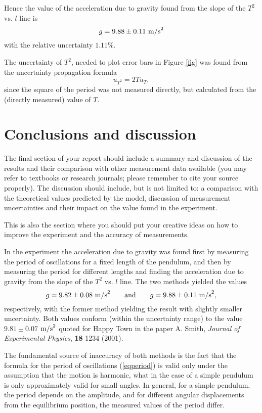 \documentclass{article}
\begin{document}
Hence the value of the acceleration due to gravity found from the slope of the $T^2$ vs. $l$ line is
$$
g = 9.88 \pm 0.11\ {\rm{m/s}}^2
$$
with the relative uncertainty $1.11\%$.

The uncertainty of $T^2$, needed to plot error bars in Figure \ref{fig} was found from the uncertainty propagation formula
$$
u_{T^2} = 2 T u_T,
$$
since the square of the period was not measured directly, but calculated from the (directly measured) value of $T$.

\section{Conclusions and discussion}

{\color{blue}The final section of your report should include a summary and discussion of the results and their comparison with other measurement data available (you may refer to textbooks or research journals; please remember to cite your source properly).  The discussion should include, but is not limited to: a comparison with the theoretical values predicted by the model, discussion of measurement uncertainties and their impact on the value found in the experiment.  

This is also the section where you should put your creative ideas on how to improve the experiment and the accuracy of measurements.}
\vspace*{1.5em}



In the experiment the acceleration due to gravity was found first by measuring the period of oscillations for a fixed length of the pendulum, and then by measuring the period for different lengths and finding the acceleration due to gravity from the slope of the $T^2$ vs. $l$ line.  The two methods yielded the values
$$
g=9.82\pm 0.08 \ {\rm{m/s}}^2 \qquad{\rm{and}}\qquad g = 9.88 \pm 0.11\ {\rm{m/s}}^2,
$$
respectively, with the former method yielding the result with slightly smaller uncertainty. Both values conform (within the uncertainty range) to the value $9.81\pm0.07$ ${\rm{m/s}}^2$ quoted for Happy Town in the paper A. Smith, \textit{Journal of Experimental Physics}, \textbf{18} 1234 (2001).

The fundamental source of inaccuracy of both methods is the fact that the formula for the period of oscillations (\ref{eqperiod}) is valid only under the assumption that the motion is harmonic, what in the case of a simple pendulum is only approximately valid for small angles. In general, for a simple pendulum, the period depends on the amplitude, and for different angular displacements from the equilibrium position, the measured values of the period differ.
\end{document}
